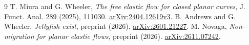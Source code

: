 \documentclass[11pt,a4paper]{article}
\begin{document}
\begin{thebibliography}{9}
 T. Miura and G. Wheeler, \emph{The free elastic flow for closed planar curves}, J. Funct. Anal. 289 (2025), 111030. \href{https://arxiv.org/abs/2404.12619v3}{arXiv:2404.12619v3}.
 B. Andrews and G. Wheeler, \emph{Jellyfish exist}, preprint (2026). \href{https://arxiv.org/abs/2601.21227}{arXiv:2601.21227}.
 M. Novaga, \emph{Non-migration for planar elastic flows}, preprint (2026). \href{https://arxiv.org/abs/2611.07242}{arXiv:2611.07242}.
\end{thebibliography}
\end{document}
